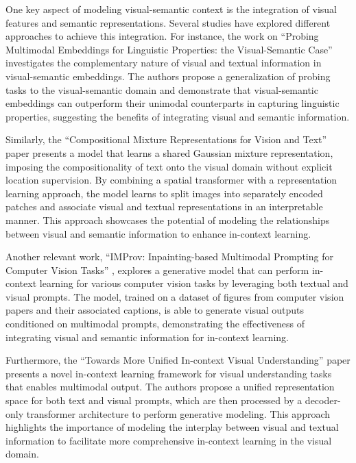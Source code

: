 \documentclass[11pt]{article}
\begin{document}
One key aspect of modeling visual-semantic context is the integration of visual features and semantic representations. Several studies have explored different approaches to achieve this integration. For instance, the work on ``Probing Multimodal Embeddings for Linguistic Properties: the Visual-Semantic Case'' \cite{ref146} investigates the complementary nature of visual and textual information in visual-semantic embeddings. The authors propose a generalization of probing tasks to the visual-semantic domain and demonstrate that visual-semantic embeddings can outperform their unimodal counterparts in capturing linguistic properties, suggesting the benefits of integrating visual and semantic information.

Similarly, the ``Compositional Mixture Representations for Vision and Text'' \cite{ref147} paper presents a model that learns a shared Gaussian mixture representation, imposing the compositionality of text onto the visual domain without explicit location supervision. By combining a spatial transformer with a representation learning approach, the model learns to split images into separately encoded patches and associate visual and textual representations in an interpretable manner. This approach showcases the potential of modeling the relationships between visual and semantic information to enhance in-context learning.

Another relevant work, ``IMProv: Inpainting-based Multimodal Prompting for Computer Vision Tasks'' \cite{ref148}, explores a generative model that can perform in-context learning for various computer vision tasks by leveraging both textual and visual prompts. The model, trained on a dataset of figures from computer vision papers and their associated captions, is able to generate visual outputs conditioned on multimodal prompts, demonstrating the effectiveness of integrating visual and semantic information for in-context learning.

Furthermore, the ``Towards More Unified In-context Visual Understanding'' \cite{ref11} paper presents a novel in-context learning framework for visual understanding tasks that enables multimodal output. The authors propose a unified representation space for both text and visual prompts, which are then processed by a decoder-only transformer architecture to perform generative modeling. This approach highlights the importance of modeling the interplay between visual and textual information to facilitate more comprehensive in-context learning in the visual domain.
\end{document}
